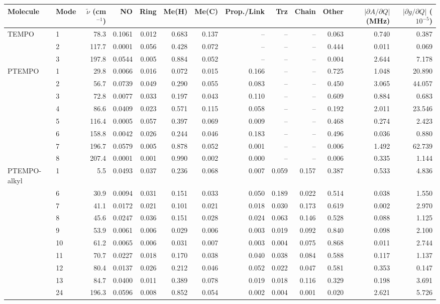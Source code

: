 \begin{tabular}{llrrrrrrrrrrr}
\toprule
Molecule & Mode & $\tilde\nu$ (cm$^{-1}$) & NO & Ring & Me(H) & Me(C) & Prop./Link & Trz & Chain & Other & $|\partial A/\partial Q|$ (MHz) & $|\partial g/\partial Q|$ ($10^{-5}$)\\
\midrule
TEMPO & 1 & 78.3 & 0.1061 & 0.012 & 0.683 & 0.137 & -- & -- & -- & 0.063 & 0.740 & 0.387\\
 & 2 & 117.7 & 0.0001 & 0.056 & 0.428 & 0.072 & -- & -- & -- & 0.444 & 0.011 & 0.069\\
 & 3 & 197.8 & 0.0544 & 0.005 & 0.884 & 0.052 & -- & -- & -- & 0.004 & 2.644 & 7.178\\
\midrule
PTEMPO & 1 & 29.8 & 0.0066 & 0.016 & 0.072 & 0.015 & 0.166 & -- & -- & 0.725 & 1.048 & 20.890\\
 & 2 & 56.7 & 0.0739 & 0.049 & 0.290 & 0.055 & 0.083 & -- & -- & 0.450 & 3.065 & 44.057\\
 & 3 & 72.8 & 0.0077 & 0.033 & 0.197 & 0.043 & 0.110 & -- & -- & 0.609 & 0.884 & 0.683\\
 & 4 & 86.6 & 0.0409 & 0.023 & 0.571 & 0.115 & 0.058 & -- & -- & 0.192 & 2.011 & 23.546\\
 & 5 & 116.4 & 0.0005 & 0.057 & 0.397 & 0.069 & 0.009 & -- & -- & 0.468 & 0.274 & 2.423\\
 & 6 & 158.8 & 0.0042 & 0.026 & 0.244 & 0.046 & 0.183 & -- & -- & 0.496 & 0.036 & 0.880\\
 & 7 & 196.7 & 0.0579 & 0.005 & 0.878 & 0.052 & 0.001 & -- & -- & 0.006 & 1.492 & 62.739\\
 & 8 & 207.4 & 0.0001 & 0.001 & 0.990 & 0.002 & 0.000 & -- & -- & 0.006 & 0.335 & 1.144\\
\midrule
PTEMPO-alkyl & 1 & 5.5 & 0.0493 & 0.037 & 0.236 & 0.068 & 0.007 & 0.059 & 0.157 & 0.387 & 0.533 & 4.836\\
 & 6 & 30.9 & 0.0094 & 0.031 & 0.151 & 0.033 & 0.050 & 0.189 & 0.022 & 0.514 & 0.038 & 1.550\\
 & 7 & 41.1 & 0.0172 & 0.021 & 0.101 & 0.021 & 0.018 & 0.030 & 0.173 & 0.619 & 0.002 & 2.970\\
 & 8 & 45.6 & 0.0247 & 0.036 & 0.151 & 0.028 & 0.024 & 0.063 & 0.146 & 0.528 & 0.088 & 1.125\\
 & 9 & 53.9 & 0.0061 & 0.006 & 0.029 & 0.006 & 0.003 & 0.019 & 0.092 & 0.840 & 0.098 & 2.100\\
 & 10 & 61.2 & 0.0065 & 0.006 & 0.031 & 0.007 & 0.003 & 0.004 & 0.075 & 0.868 & 0.011 & 2.744\\
 & 11 & 70.7 & 0.0227 & 0.018 & 0.170 & 0.038 & 0.040 & 0.038 & 0.084 & 0.588 & 0.117 & 1.137\\
 & 12 & 80.4 & 0.0137 & 0.026 & 0.212 & 0.046 & 0.052 & 0.022 & 0.047 & 0.581 & 0.353 & 0.147\\
 & 13 & 84.7 & 0.0400 & 0.011 & 0.389 & 0.078 & 0.019 & 0.018 & 0.116 & 0.329 & 0.198 & 3.691\\
 & 24 & 196.3 & 0.0596 & 0.008 & 0.852 & 0.054 & 0.002 & 0.004 & 0.001 & 0.020 & 2.621 & 5.726\\
\bottomrule
\end{tabular}
